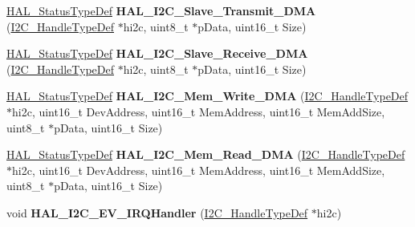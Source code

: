 \begin{DoxyCompactItemize}
\hyperlink{stm32f1xx__hal__def_8h_a63c0679d1cb8b8c684fbb0632743478f}{H\+A\+L\+\_\+\+Status\+Type\+Def} {\bfseries H\+A\+L\+\_\+\+I2\+C\+\_\+\+Slave\+\_\+\+Transmit\+\_\+\+D\+MA} (\hyperlink{struct_i2_c___handle_type_def}{I2\+C\+\_\+\+Handle\+Type\+Def} $\ast$hi2c, uint8\+\_\+t $\ast$p\+Data, uint16\+\_\+t Size)
\item 
\mbox{\label{group___i2_c___exported___functions___group2_gad9dd42a10e5c108e30e6546cb64639c2}} 
\hyperlink{stm32f1xx__hal__def_8h_a63c0679d1cb8b8c684fbb0632743478f}{H\+A\+L\+\_\+\+Status\+Type\+Def} {\bfseries H\+A\+L\+\_\+\+I2\+C\+\_\+\+Slave\+\_\+\+Receive\+\_\+\+D\+MA} (\hyperlink{struct_i2_c___handle_type_def}{I2\+C\+\_\+\+Handle\+Type\+Def} $\ast$hi2c, uint8\+\_\+t $\ast$p\+Data, uint16\+\_\+t Size)
\item 
\mbox{\label{group___i2_c___exported___functions___group2_ga12a2a86be393359534f630cdd090d8bb}} 
\hyperlink{stm32f1xx__hal__def_8h_a63c0679d1cb8b8c684fbb0632743478f}{H\+A\+L\+\_\+\+Status\+Type\+Def} {\bfseries H\+A\+L\+\_\+\+I2\+C\+\_\+\+Mem\+\_\+\+Write\+\_\+\+D\+MA} (\hyperlink{struct_i2_c___handle_type_def}{I2\+C\+\_\+\+Handle\+Type\+Def} $\ast$hi2c, uint16\+\_\+t Dev\+Address, uint16\+\_\+t Mem\+Address, uint16\+\_\+t Mem\+Add\+Size, uint8\+\_\+t $\ast$p\+Data, uint16\+\_\+t Size)
\item 
\mbox{\label{group___i2_c___exported___functions___group2_gab25b99552182d2486d8eb441fffdd0a4}} 
\hyperlink{stm32f1xx__hal__def_8h_a63c0679d1cb8b8c684fbb0632743478f}{H\+A\+L\+\_\+\+Status\+Type\+Def} {\bfseries H\+A\+L\+\_\+\+I2\+C\+\_\+\+Mem\+\_\+\+Read\+\_\+\+D\+MA} (\hyperlink{struct_i2_c___handle_type_def}{I2\+C\+\_\+\+Handle\+Type\+Def} $\ast$hi2c, uint16\+\_\+t Dev\+Address, uint16\+\_\+t Mem\+Address, uint16\+\_\+t Mem\+Add\+Size, uint8\+\_\+t $\ast$p\+Data, uint16\+\_\+t Size)
\item 
\mbox{\label{group___i2_c___exported___functions___group2_ga0cd3cc56c83b85a65e31c945c854d9d5}} 
void {\bfseries H\+A\+L\+\_\+\+I2\+C\+\_\+\+E\+V\+\_\+\+I\+R\+Q\+Handler} (\hyperlink{struct_i2_c___handle_type_def}{I2\+C\+\_\+\+Handle\+Type\+Def} $\ast$hi2c)
\item 
\mbox{\label{group___i2_c___exported___functions___group2_ga78739c0d57d55034a9c8bc39c8ee6bc2}} 

\end{DoxyCompactItemize}
